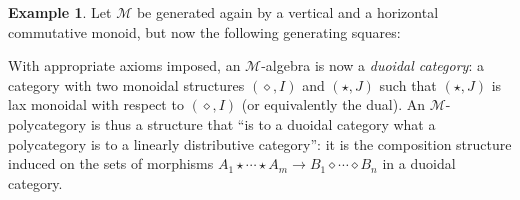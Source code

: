 \documentclass{article}
\theoremstyle{definition}
\newtheorem{eg}[thm]{Example}
\theoremstyle{remark}
\def\M{\mathcal{M}}
\def\mult{\mathfrak{m}}
\def\twocell#1#2#3{\ar[from=#1,to=#2,phantom,""{name=1,near start},""{name=2,near end}]\ar[Rightarrow,from=1,to=2,"#3"]}
\def\drtwocell{\twocell{r}{d}}
\def\drrtwocell{\twocell{rr}{d}}
\begin{document}
\begin{eg}\label{eg:duoidal}
  Let $\M$ be generated again by a vertical and a horizontal commutative monoid, but now the following generating squares:
  With appropriate axioms imposed, an $\M$-algebra is now a \emph{duoidal category}: a category with two monoidal structures $(\diamond,I)$ and $(\star,J)$ such that $(\star,J)$ is lax monoidal with respect to $(\diamond,I)$ (or equivalently the dual).
  An $\M$-polycategory is thus a structure that ``is to a duoidal category what a polycategory is to a linearly distributive category'': it is the composition structure induced on the sets of morphisms $A_1 \star \cdots \star A_m \to B_1\diamond \cdots \diamond B_n$ in a duoidal category.
\end{eg}
\end{document}
